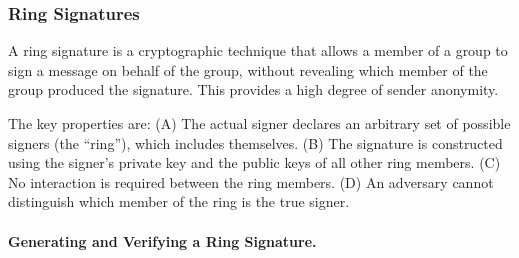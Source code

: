 
\subsubsection{Ring Signatures}\label{ring-signatures}

A ring signature is a cryptographic technique that allows a member of a
group to sign a message on behalf of the group, without revealing which
member of the group produced the signature. This provides a high degree
of sender anonymity.


The key properties are: (A) The actual signer declares an arbitrary set of
possible signers (the ``ring''), which includes themselves. (B) The
signature is constructed using the signer's private key and the public
keys of all other ring members. (C) No interaction is required between the
ring members. (D) An adversary cannot distinguish which member of the ring
is the true signer.


\paragraph{Generating and Verifying a Ring
Signature.}\label{generating-and-verifying-a-ring-signature}

